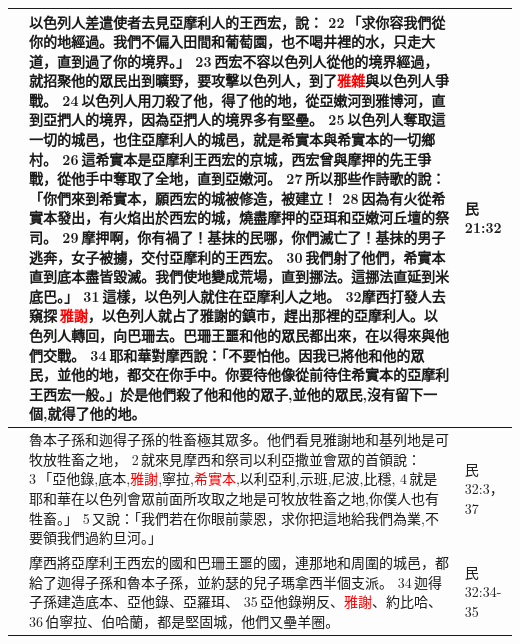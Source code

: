 \begin{table}[H]
\centering 
\begin{tabular}{p{}|p{14cm}|p{}}\hline\hline
&以色列人差遣使者去見亞摩利人的王西宏，說： 22 「求你容我們從你的地經過。我們不偏入田間和葡萄園，也不喝井裡的水，只走大道，直到過了你的境界。」 23 西宏不容以色列人從他的境界經過，就招聚他的眾民出到曠野，要攻擊以色列人，到了\textcolor{red}{雅雜}與以色列人爭戰。 24 以色列人用刀殺了他，得了他的地，從亞嫩河到雅博河，直到亞捫人的境界，因為亞捫人的境界多有堅壘。 25 以色列人奪取這一切的城邑，也住亞摩利人的城邑，就是希實本與希實本的一切鄉村。 26 這希實本是亞摩利王西宏的京城，西宏曾與摩押的先王爭戰，從他手中奪取了全地，直到亞嫩河。 27 所以那些作詩歌的說：「你們來到希實本，願西宏的城被修造，被建立！ 28 因為有火從希實本發出，有火焰出於西宏的城，燒盡摩押的亞珥和亞嫩河丘壇的祭司。 29 摩押啊，你有禍了！基抹的民哪，你們滅亡了！基抹的男子逃奔，女子被擄，交付亞摩利的王西宏。 30 我們射了他們，希實本直到底本盡皆毀滅。我們使地變成荒場，直到挪法。這挪法直延到米底巴。」 31 這樣，以色列人就住在亞摩利人之地。 32摩西打發人去窺探 \textcolor{red}{雅謝}，以色列人就占了雅謝的鎮市，趕出那裡的亞摩利人。以色列人轉回，向巴珊去。巴珊王噩和他的眾民都出來，在以得來與他們交戰。 34 耶和華對摩西說：「不要怕他。因我已將他和他的眾民，並他的地，都交在你手中。你要待他像從前待住希實本的亞摩利王西宏一般。」於是他們殺了他和他的眾子,並他的眾民,沒有留下一個,就得了他的地。&民21:32\\\hline


&魯本子孫和迦得子孫的牲畜極其眾多。他們看見雅謝地和基列地是可牧放牲畜之地， 2 就來見摩西和祭司以利亞撒並會眾的首領說： 3 「亞他錄,底本,\textcolor{red}{雅謝},寧拉,\textcolor{red}{希實本},以利亞利,示班,尼波,比穩, 4 就是耶和華在以色列會眾前面所攻取之地是可牧放牲畜之地,你僕人也有牲畜。」 5 又說：「我們若在你眼前蒙恩，求你把這地給我們為業,不要領我們過約旦河。」&民32:3，37\\\hline


&摩西將亞摩利王西宏的國和巴珊王噩的國，連那地和周圍的城邑，都給了迦得子孫和魯本子孫，並約瑟的兒子瑪拿西半個支派。 34 迦得子孫建造底本、亞他錄、亞羅珥、 35 亞他錄朔反、\textcolor{red}{雅謝}、約比哈、 36 伯寧拉、伯哈蘭，都是堅固城，他們又壘羊圈。&民32:34-35\\\hline


\end{tabular}
\end{table}
